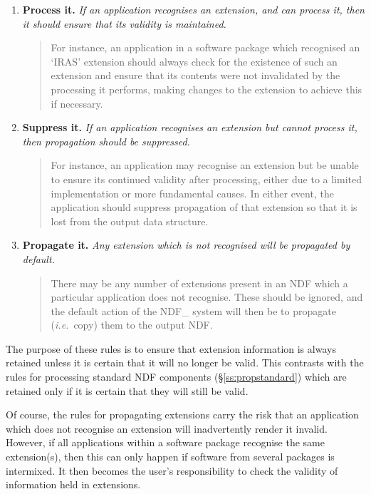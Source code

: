 \documentclass[twoside,11pt,nolof]{starlink}
\providecommand{\st}[1]{{\emph{#1}}}
\begin{document}
\begin{enumerate}

\item \textbf{Process it.}
\st{If an application recognises an extension, and can process it, then it
should ensure that its validity is maintained.}

\small
\begin{quote}
For instance, an application in a software package which recognised an
`IRAS' extension should always check for the existence of such an extension
and ensure that its contents were not invalidated by the processing it
performs, making changes to the extension to achieve this if necessary.
\end{quote}
\normalsize

\item \textbf{Suppress it.}
\st{If an application recognises an extension but cannot process it, then
propagation should be suppressed.}

\small
\begin{quote}
For instance, an application may recognise an extension but be unable to
ensure its continued validity after processing, either due to a limited
implementation or more fundamental causes.
In either event, the application should suppress propagation of that
extension so that it is lost from the output data structure.
\end{quote}
\normalsize

\item \textbf{Propagate it.}
\st{Any extension which is not recognised will be propagated by default.}

\small
\begin{quote}
There may be any number of extensions present in an NDF which a particular
application does not recognise.
These should be ignored, and the default action of the NDF\_ system will
then be to propagate (\st{i.e.}\ copy) them to the output NDF.
\end{quote}
\normalsize


\end{enumerate}

The purpose of these rules is to ensure that extension information is always
retained unless it is certain that it will no longer be valid.
This contrasts with the rules for processing standard NDF components
(\S\ref{ss:propstandard}) which are retained only if it is certain that they
will still be valid.

Of course, the rules for propagating extensions carry the risk that an
application which does not recognise an extension will inadvertently render
it invalid.
However, if all applications within a software package recognise the same
extension(s), then this can only happen if software from several packages is
intermixed.
It then becomes the user's responsibility to check the validity of
information held in extensions.
\end{document}
